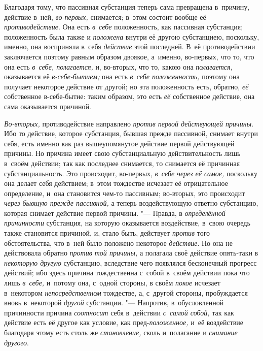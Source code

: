 Благодаря тому, что пассивная субстанция теперь сама превращена в~причину,
действие в~ней, {\em во-первых,} снимается; в~этом
состоит вообще её {\em противодействие}. Она есть
{\em в~себе} положенность, как пассивная субстанция;
положенность была также и {\em положена} внутри её
другою субстанциею, поскольку, именно, она восприняла в~себя
{\em действие} этой последней. В~её противодействии
заключается поэтому равным образом двоякое, а~именно, во-первых, что то,
что она есть {\em в~себе, полагается,} и, во-вторых, что то, какою она
{\em полагается,} оказывается её {\em в-себе-бытием;} она есть
{\em в~себе положенность,} поэтому она получает
некоторое действие от другой; но эта положенность есть, обратно,
{\em её} собственное в-себе-бытие: таким образом, это
есть {\em её} собственное действие, она сама оказывается причиной.

{\em Во-вторых,} противодействие направлено
{\em против первой действующей причины}. Ибо то
действие, которое субстанция, бывшая прежде пассивной, снимает внутри себя,
есть именно как раз вышеупомянутое действие первой действующей причины. Но
причина имеет свою субстанциальную действительность лишь в~своём действии;
так как последнее снимается, то снимается её причинная субстанциальность.
Это происходит, во-первых, {\em в~себе через её самое,}
поскольку она делает себя действием; в~этом тождестве исчезает её
отрицательное определение, и~она становится чем-то пассивным; во-вторых,
это происходит {\em через бывшую прежде пассивной,} а
теперь воздействующую ответно субстанцию, которая снимает действие первой
причины. "--- Правда, в {\em определённой причинности}
субстанция, на которую оказывается воздействие, в~свою очередь также
становится причиной, и, стало быть, действует
{\em против} того обстоятельства, что в~ней было
положено некоторое {\em действие}. Но она не
действовала обратно {\em против той причины,} а
полагала своё действие опять-таки в {\em некоторую
другую} субстанцию, вследствие чего появлялся бесконечный прогресс
действий; ибо здесь причина тождественна с~собой в~своём действии пока что
лишь {\em в~себе,} и~потому она, с~одной стороны, в
своём {\em покое} исчезает в~некотором
{\em непосредственном} тождестве, а, с~другой стороны,
пробуждается вновь в~некоторой {\em другой} субстанции.
"--- Напротив, в~обусловленной причинности причина
{\em соотносит} себя в~действии
{\em с~самой собой,} так как действие есть её другое
как условие, как пред-{\em положенное,} и~её
воздействие благодаря этому есть столь же
{\em становление,} сколь и~полагание и {\em снимание другого}.

